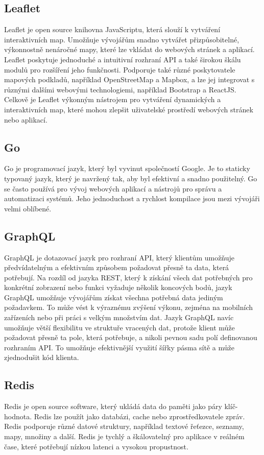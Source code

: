 \subsection{Leaflet}
Leaflet je open source knihovna JavaScriptu, která slouží k vytváření interaktivních map. Umožňuje vývojářům snadno vytvářet přizpůsobitelné, výkonnostně nenáročné mapy, které lze vkládat do webových stránek a aplikací. Leaflet poskytuje jednoduché a intuitivní rozhraní API a také širokou škálu modulů pro rozšíření jeho funkčnosti. Podporuje také různé poskytovatele mapových podkladů, například OpenStreetMap a Mapbox, a lze jej integrovat s různými dalšími webovými technologiemi, například Bootstrap a ReactJS. Celkově je Leaflet výkonným nástrojem pro vytváření dynamických a interaktivních map, které mohou zlepšit uživatelské prostředí webových stránek nebo aplikací.
\subsection{Go}
Go je programovací jazyk, který byl vyvinut společností Google. Je to staticky typovaný jazyk, který je navržený tak, aby byl efektivní a snadno použitelný. Go se často používá pro vývoj webových aplikací a nástrojů pro správu a automatizaci systémů. Jeho jednoduchost a rychlost kompilace jsou mezi vývojáři velmi oblíbené.

\subsection{GraphQL}
GraphQL je dotazovací jazyk pro rozhraní API, který klientům umožňuje předvídatelným a efektivním způsobem požadovat přesně ta data, která potřebují. Na rozdíl od jazyka REST, který k získání všech dat potřebných pro konkrétní zobrazení nebo funkci vyžaduje několik koncových bodů, jazyk GraphQL umožňuje vývojářům získat všechna potřebná data jediným požadavkem. To může vést k výraznému zvýšení výkonu, zejména na mobilních zařízeních nebo při práci s velkým množstvím dat. Jazyk GraphQL navíc umožňuje větší flexibilitu ve struktuře vracených dat, protože klient může požadovat přesně ta pole, která potřebuje, a nikoli pevnou sadu polí definovanou rozhraním API. To umožňuje efektivnější využití šířky pásma sítě a může zjednodušit kód klienta.
\subsection{Redis}\label{redis}
Redis je open source software, který ukládá data do paměti jako páry klíč-hodnota. Redis lze použít jako databázi, cache nebo zprostředkovatele zpráv. Redis podporuje různé datové struktury, například textové řeťezce, seznamy, mapy, množiny a další. Redis je tychlý a škálovatelný pro aplikace v reálném čase, které potřebují nízkou latenci a vysokou propustnost.

